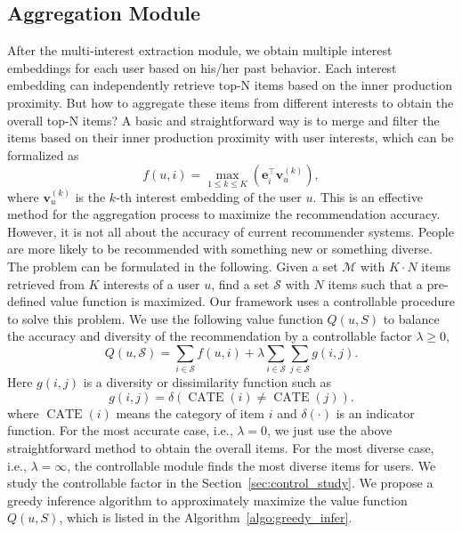 \subsection{Aggregation Module}
After the multi-interest extraction module, we obtain multiple interest embeddings for each user based on his/her past behavior. Each interest embedding can independently retrieve top-N items based on the inner production proximity. But how to aggregate these items from different interests to obtain the overall top-N items? A basic and straightforward way is to merge and filter the items based on their inner production proximity with user interests, which can be formalized as
\begin{equation}
    f(u,i) = \max_{1\leq k\leq K}(\mathbf{e}_i^\top \mathbf{v}_u^{(k)}),
\end{equation}
where $\mathbf{v}_u^{(k)}$ is the $k$-th interest embedding of the user $u$. This is an effective method for the aggregation process to maximize the recommendation accuracy. However, it is not all about the accuracy of current recommender systems. People are more likely to be recommended with something new or something diverse. 
The problem can be formulated in the following. Given a set $\mathcal{M}$ with $K\cdot N$ items retrieved from $K$ interests of a user $u$, find a set $\mathcal{S}$ with $N$ items such that a pre-defined value function is maximized. Our framework uses a controllable procedure to solve this problem. We use the following value function $Q(u,S)$ to balance the accuracy and diversity of the recommendation by a controllable factor $\lambda \geq 0$,
\begin{equation}
    Q(u,\mathcal{S}) = \sum_{i\in \mathcal{S}} f(u,i) + \lambda \sum_{i\in \mathcal{S}} \sum_{j\in \mathcal{S}} g(i,j).
\end{equation}
\noindent Here $g(i,j)$ is a diversity or dissimilarity function such as
\begin{equation}
    g(i,j) = \delta(\operatorname{CATE}(i) \neq \operatorname{CATE}(j)).
\end{equation}
where $\operatorname{CATE}(i)$ means the category of item $i$ and $\delta(\cdot)$ is an indicator function. 
For the most accurate case, i.e., $\lambda=0$, we just use the above straightforward method to obtain the overall items. For the most diverse case, i.e., $\lambda=\infty$, the controllable module finds the most diverse items for users. We study the controllable factor in the Section~\ref{sec:control_study}. We propose a greedy inference algorithm to approximately maximize the value function $Q(u,S)$, which is listed in the Algorithm~\ref{algo:greedy_infer}.



